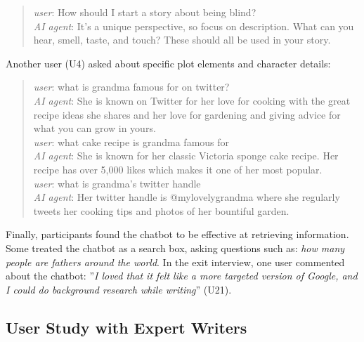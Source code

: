 

\begin{quote}
    {\color{blue}\textit{user}:} How should I start a story about being blind?\\
    {\color{blue}\textit{AI agent}:} It's a unique perspective, so focus on description. What can you hear, smell, taste, and touch? These should all be used in your story.
\end{quote}

\noindent Another user (U4) asked about specific plot elements and character details:

\begin{quote}
    {\color{blue}\textit{user}:} what is grandma famous for on twitter?\\
    {\color{blue}\textit{AI agent}:} She is known on Twitter for her love for cooking with the great recipe ideas she shares and her love for gardening and giving advice for what you can grow in yours.\\
    {\color{blue}\textit{user}:} what cake recipe is grandma famous for\\
    {\color{blue}\textit{AI agent}:} She is known for her classic Victoria sponge cake recipe. Her recipe has over 5,000 likes which makes it one of her most popular.\\
    {\color{blue}\textit{user}:} what is grandma's twitter handle\\
    {\color{blue}\textit{AI agent}:} Her twitter handle is @mylovelygrandma where she regularly tweets her cooking tips and photos of her bountiful garden.
\end{quote}

Finally, participants found the chatbot to be effective at retrieving information. Some treated the chatbot as a search box, asking questions such as: \textit{how many people are fathers around the world}. In the exit interview, one user commented about the chatbot: ''\textit{I loved that it felt like a more targeted version of Google, and I could do background research while writing}'' (U21).

\subsection{User Study with Expert Writers}

